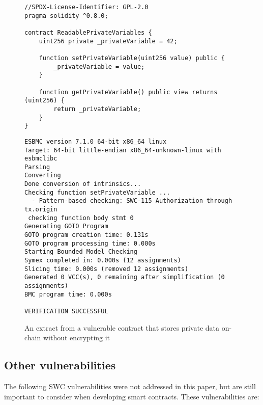 \begin{figure}
\begin{lstlisting}
//SPDX-License-Identifier: GPL-2.0
pragma solidity ^0.8.0;

contract ReadablePrivateVariables {
    uint256 private _privateVariable = 42;

    function setPrivateVariable(uint256 value) public {
        _privateVariable = value;
    }

    function getPrivateVariable() public view returns (uint256) {
        return _privateVariable;
    }
}
\end{lstlisting}
\begin{lstlisting}
ESBMC version 7.1.0 64-bit x86_64 linux
Target: 64-bit little-endian x86_64-unknown-linux with esbmclibc
Parsing
Converting
Done conversion of intrinsics...
Checking function setPrivateVariable ...
  - Pattern-based checking: SWC-115 Authorization through tx.origin
 checking function body stmt 0
Generating GOTO Program
GOTO program creation time: 0.131s
GOTO program processing time: 0.000s
Starting Bounded Model Checking
Symex completed in: 0.000s (12 assignments)
Slicing time: 0.000s (removed 12 assignments)
Generated 0 VCC(s), 0 remaining after simplification (0 assignments)
BMC program time: 0.000s

VERIFICATION SUCCESSFUL
\end{lstlisting}
\caption{An extract from a vulnerable contract that stores private data on-chain without encrypting it}
\label{fig:unencrypted_private_data_on_chain}
\end{figure}

\subsection{Other vulnerabilities}
\label{sec:other_vulnerabilities}

The following SWC \cite{swc} vulnerabilities were not addressed in this paper, but are still important to consider when developing smart contracts. These vulnerabilities are:

